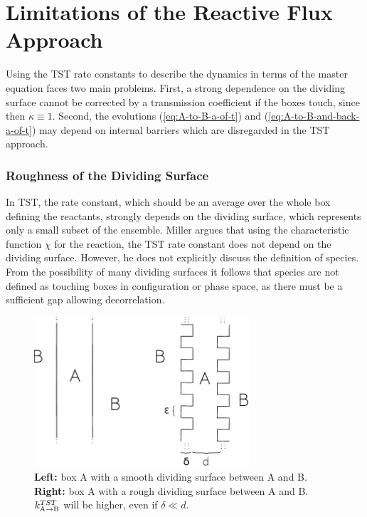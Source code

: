 \section{Limitations of the Reactive Flux Approach}
\label{sec:limit}

Using the TST rate constants to describe the dynamics in terms of the master equation faces two main problems.
First, a strong dependence on the dividing surface cannot be corrected by a transmission coefficient if the boxes touch, since then $\kappa \equiv 1$.
Second, the evolutions (\ref{eq:A-to-B-a-of-t}) and (\ref{eq:A-to-B-and-back-a-of-t}) may depend on internal barriers which are disregarded in the TST approach.

\subsubsection*{Roughness of the Dividing Surface}

In TST, the rate constant, which should be an average over the whole box defining the reactants, strongly depends on the dividing surface, which represents only a small subset of the ensemble.
Miller argues\cite{Miller1976} that using the characteristic function $\chi$ for the reaction, the TST rate constant does not depend on the dividing surface.
However, he does not explicitly discuss the definition of species.
From the possibility of many dividing surfaces it follows that species are not defined as touching boxes in configuration or phase space, as there must be a sufficient gap allowing decorrelation.


\begin{figure}[htb]
\centering
\includegraphics[width=8cm]{Images/diag3.pdf}
\caption[Effect of surface roughness on the rate constant.]{\textbf{Left:} box A with a smooth dividing surface between A and B. \textbf{Right:} box A with a rough dividing surface between A and B. $k^{TST}_{\rm A\rightarrow B}$ will be higher, even if $\delta \ll d$. }
\label{fig:rough}
\end{figure}

